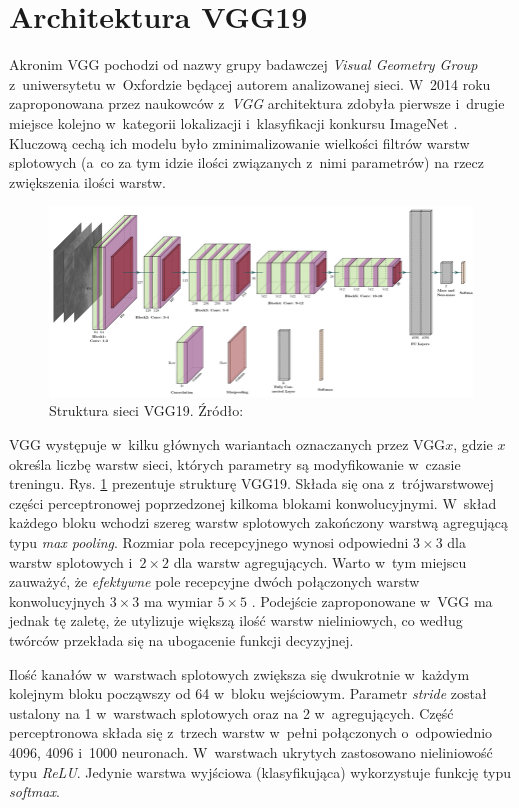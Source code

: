 \section{Architektura VGG19}

Akronim VGG pochodzi od nazwy grupy badawczej \textit{Visual Geometry Group} z~uniwersytetu w~Oxfordzie będącej autorem analizowanej sieci. W~2014 roku zaproponowana przez naukowców z~\textit{VGG} architektura zdobyła pierwsze i~drugie miejsce kolejno w~kategorii lokalizacji i~klasyfikacji konkursu ImageNet \cite{vgg19}. Kluczową cechą ich modelu było zminimalizowanie wielkości filtrów warstw splotowych (a~co za tym idzie ilości związanych z~nimi parametrów) na rzecz zwiększenia ilości warstw.

\vspace{0.5cm}
\begin{figure}[h]
    \centering
    \includegraphics[scale=0.35]{img/vgg_structure.png}
    \caption{Struktura sieci VGG19. Źródło: \cite{vgg_structure}}
    \label{vgg_structure_img}
\end{figure}
\vspace{0.5cm}

\noindent
VGG występuje w~kilku głównych wariantach oznaczanych przez VGG$x$, gdzie $x$ określa liczbę warstw sieci, których parametry są modyfikowanie w~czasie treningu. Rys. \ref{vgg_structure_img} prezentuje strukturę VGG19. Składa się ona z~trójwarstwowej części perceptronowej poprzedzonej kilkoma blokami konwolucyjnymi. W~skład każdego bloku wchodzi szereg warstw splotowych zakończony warstwą agregującą typu \textit{max pooling}. Rozmiar pola recepcyjnego wynosi odpowiedni $3\times3$ dla warstw splotowych i~$2\times2$ dla warstw agregujących. Warto w~tym miejscu zauważyć, że \textit{efektywne} pole recepcyjne dwóch połączonych warstw konwolucyjnych $3\times3$ ma wymiar $5\times5$ \cite{recept_field}. Podejście zaproponowane w~VGG ma jednak tę zaletę, że utylizuje większą ilość warstw nieliniowych, co według twórców przekłada się na ubogacenie funkcji decyzyjnej.

Ilość kanałów w~warstwach splotowych zwiększa się dwukrotnie w~każdym kolejnym bloku począwszy od 64 w~bloku wejściowym. Parametr \textit{stride} został ustalony na 1 w~warstwach splotowych oraz na 2 w~agregujących. Część perceptronowa składa się z~trzech warstw w~pełni połączonych o~odpowiednio 4096, 4096 i~1000 neuronach. W~warstwach ukrytych zastosowano nieliniowość typu \textit{ReLU}. Jedynie warstwa wyjściowa (klasyfikująca) wykorzystuje funkcję typu \textit{softmax}.